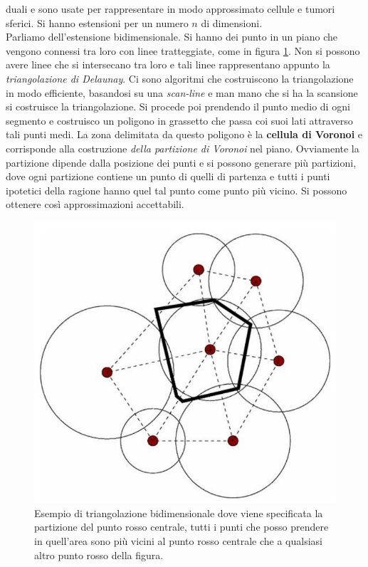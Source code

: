 \documentclass[a4paper,12pt, oneside]{book}
\begin{document}
duali e sono usate per rappresentare in modo approssimato cellule e tumori
sferici. Si hanno estensioni per un numero $n$ di dimensioni.\\
Parliamo dell'estensione bidimensionale. Si hanno dei punto in un piano che
vengono connessi tra loro con linee tratteggiate, come in figura
\ref{fig:tri}. Non si possono avere linee che si intersecano tra loro e tali
linee rappresentano appunto la \textit{triangolazione di Delaunay}. Ci sono
algoritmi che costruiscono la triangolazione in modo efficiente, basandosi su
una \textit{scan-line} e man mano che si ha la scansione si costruisce la
triangolazione. Si procede poi prendendo il punto medio di ogni segmento e
costruisco un poligono in grassetto che passa coi suoi lati attraverso tali
punti medi. La zona delimitata da questo poligono è la \textbf{cellula di
  Voronoi} e corrisponde alla costruzione  \textit{della partizione di Voronoi}
nel piano. Ovviamente la partizione dipende dalla posizione dei punti e si
possono generare più partizioni, dove ogni partizione contiene un punto di
quelli di partenza e tutti i punti ipotetici della ragione hanno quel tal punto
come punto più vicino. Si possono ottenere così approssimazioni accettabili.\\
\begin{figure}
  \centering
  \includegraphics[scale = 0.3]{img/tri.jpg}
  \caption{Esempio di triangolazione bidimensionale dove viene specificata la
    partizione del punto rosso centrale, tutti i punti che posso prendere in
    quell'area sono più vicini al punto rosso centrale che a qualsiasi altro
    punto rosso della figura.}
  \label{fig:tri}
\end{figure}
\end{document}
